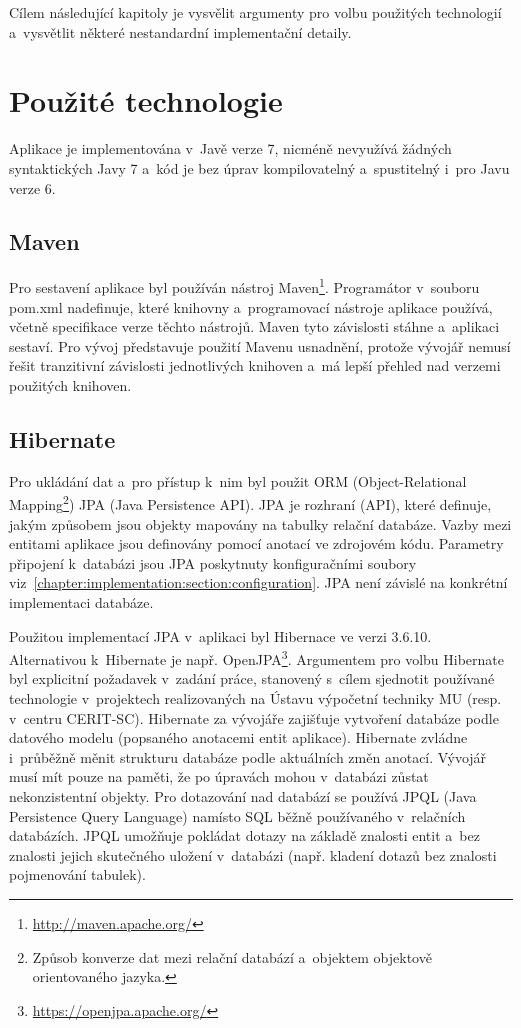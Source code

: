 \documentclass[11pt, final, oneside]{fithesis2}
\begin{document}
Cílem následující kapitoly je vysvělit argumenty pro volbu použitých technologií a~vysvětlit některé nestandardní implementační detaily.

\section{Použité technologie}
Aplikace je implementována v~Javě verze 7, nicméně nevyužívá žádných syntaktických  Javy 7 a~kód je bez úprav kompilovatelný a~spustitelný i~pro Javu verze 6. 

\subsection{Maven}
Pro sestavení aplikace byl používán nástroj Maven\footnote{\url{http://maven.apache.org/}}. Programátor v~souboru pom.xml nadefinuje, které knihovny a~programovací nástroje aplikace používá, včetně specifikace verze těchto nástrojů. Maven tyto závislosti stáhne a~aplikaci sestaví. Pro vývoj představuje použití Mavenu usnadnění, protože vývojář nemusí řešit tranzitivní závislosti jednotlivých knihoven a~má lepší přehled nad verzemi použitých knihoven. 

\subsection{Hibernate}
Pro ukládání dat a~pro přístup k~nim byl použit ORM (Object-Relational Mapping\footnote{Způsob konverze dat mezi relační databází a~objektem objektově orientovaného jazyka.}) JPA (Java Persistence API). JPA je rozhraní (API), které definuje, jakým způsobem jsou objekty mapovány na tabulky relační databáze. Vazby mezi entitami aplikace jsou definovány pomocí anotací ve zdrojovém kódu. Parametry připojení k~databázi jsou JPA poskytnuty konfiguračními soubory viz~\ref{chapter:implementation:section:configuration}. JPA není závislé na konkrétní implementaci databáze.

Použitou implementací JPA v~aplikaci byl Hibernace ve verzi 3.6.10. Alternativou k~Hibernate je např. OpenJPA\footnote{\url{https://openjpa.apache.org/}}. Argumentem pro volbu Hibernate byl explicitní požadavek v~zadání práce, stanovený s~cílem sjednotit používané technologie v~projektech realizovaných na Ústavu výpočetní techniky MU (resp. v~centru CERIT-SC). 
Hibernate za vývojáře zajišťuje vytvoření databáze podle datového modelu (popsaného anotacemi entit aplikace). Hibernate zvládne i~průběžně měnit strukturu databáze podle aktuálních změn anotací. Vývojář musí mít pouze na paměti, že po úpravách mohou v~databázi zůstat nekonzistentní objekty.
Pro dotazování nad databází se používá JPQL (Java Persistence Query Language) namísto SQL běžně používaného v~relačních databázích. JPQL umožňuje pokládat dotazy na základě znalosti entit a~bez znalosti jejich skutečného uložení v~databázi (např. kladení dotazů bez znalosti pojmenování tabulek).
\end{document}
